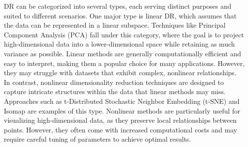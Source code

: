 \documentclass{siamltex}
\begin{document}
DR can be categorized into several types, each serving distinct purposes and suited to different scenarios. One major type is linear DR, which assumes that the data can be represented in a linear subspace. Techniques like Principal Component Analysis (PCA) fall under this category, where the goal is to project high-dimensional data into a lower-dimensional space while retaining as much variance as possible. Linear methods are generally computationally efficient and easy to interpret, making them a popular choice for many applications. However, they may struggle with datasets that exhibit complex, nonlinear relationships.\\
In contrast, nonlinear dimensionality reduction techniques are designed to capture intricate structures within the data that linear methods may miss. Approaches such as t-Distributed Stochastic Neighbor Embedding (t-SNE) and Isomap are examples of this type. Nonlinear methods are particularly useful for visualizing high-dimensional data, as they preserve local relationships between points. However, they often come with increased computational costs and may require careful tuning of parameters to achieve optimal results.
\end{document}
